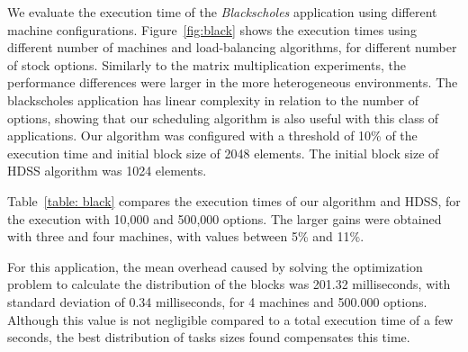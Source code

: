 \documentclass[journal]{IEEEtran}
\begin{document}
We evaluate the execution time of the \emph{Blackscholes} application using
different machine configurations. Figure~\ref{fig:black} shows the execution
times using different number of machines and load-balancing algorithms, for
different number of stock options. Similarly to the matrix multiplication
experiments, the performance differences were larger in the more heterogeneous
environments. The blackscholes application has linear complexity in relation to
the number of options, showing that our scheduling algorithm is also useful with
this class of applications. Our algorithm was configured with a threshold of 10\% of the execution time and initial block size of 2048 elements. The initial block size of HDSS algorithm was 1024 elements.

Table~\ref{table: black} compares the execution times of our algorithm and HDSS,
for the execution with 10,000 and 500,000 options. The larger gains were
obtained with three and four machines, with values between 5\% and 11\%.



For this application, the mean overhead caused by solving the optimization
problem to calculate the distribution of the blocks was 201.32 milliseconds,
with standard deviation of 0.34 milliseconds, for 4 machines and 500.000 options.
 Although this value is not negligible compared to a total execution time of a few seconds, the best
distribution of tasks sizes found compensates this time.
\end{document}
